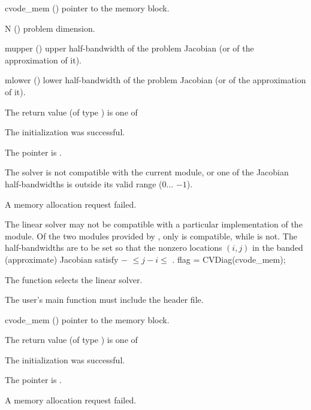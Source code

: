 {
  \begin{args}
  \item[cvode\_mem] ()
    pointer to the {\cvode} memory block.
  \item[N] ()
    problem dimension.
  \item[mupper] ()
    upper half-bandwidth of the problem Jacobian (or of the approximation of it).
  \item[mlower] ()
    lower half-bandwidth of the problem Jacobian (or of the approximation of it).
  \end{args}
}
{
  The return value  (of type ) is one of
  \begin{args}
  \item[\Id{CVBAND\_SUCCESS}] 
    The {\cvband} initialization was successful.
  \item[\Id{CVBAND\_MEM\_NULL}]
    The  pointer is .
  \item[\Id{CVBAND\_ILL\_INPUT}]
    The {\cvband} solver is not compatible with the current {\nvector} module, or
    one of the Jacobian half-bandwidths is outside its valid range
    ($0 \ldots$ $-1$).
  \item[\Id{CVBAND\_MEM\_FAIL}]
    A memory allocation request failed.
  \end{args}
}
{
  The {\cvband} linear solver may not be compatible with a particular
  implementation of the {\nvector} module. Of the two {\nvector} modules 
  provided by {\sundials}, only {\nvecs} is compatible, while {\nvecp} is not.
  The half-bandwidths are to be set so that the nonzero locations $(i,j)$ in the
  banded (approximate) Jacobian satisfy $-$ $\leq j-i \leq$ .
}
{
  flag = CVDiag(cvode\_mem);
}
{
  The function  selects the {\cvdiag} linear solver. 

  The user's main function must include the  header file.
}
{
  \begin{args}
  \item[cvode\_mem] ()
    pointer to the {\cvode} memory block.
  \end{args}
}
{
  The return value  (of type ) is one of
  \begin{args}
  \item[\Id{CVDIAG\_SUCCESS}]
    The {\cvdiag} initialization was successful.
  \item[\Id{CVDIAG\_MEM\_NULL}]
    The  pointer is .
  \item[\Id{CVDIAG\_MEM\_FAIL}]
    A memory allocation request failed.
  \end{args}
}
